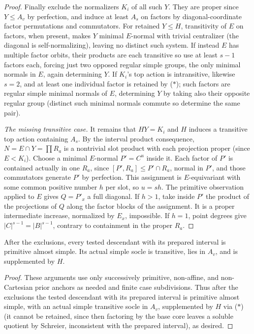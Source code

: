 \begin{proof}
Finally exclude the normalizers \(K_i\) of all such \(Y\). They are proper since \(Y\le A_v\) by perfection, and induce at least \(A_s\) on factors by diagonal-coordinate factor permutations and commutators. For retained \(Y\le H\), transitivity of \(E\) on factors, when present, makes \(Y\) minimal \(E\)-normal with trivial centralizer (the diagonal is self-normalizing), leaving no distinct such system. If instead \(E\) has multiple factor orbits, their products are each transitive so use at least \(s-1\) factors each, forcing just two opposed regular simple groups, the only minimal normals in \(E\), again determining \(Y\). If \(K_i\)'s top action is intransitive, likewise \(s=2\), and at least one individual factor is retained by (\(*\)); such factors are regular simple minimal normals of \(E\), determining \(Y\) by taking also their opposite regular group (distinct such minimal normals commute so determine the same pair).

\textit{The missing transitive case.} It remains that \(HY=K_i\) and \(H\) induces a transitive top action containing \(A_s\). By the interval product consequence, \(N=E\cap Y=\prod R_a\) is a nontrivial slot product with each projection proper (since \(E<K_i\)). Choose a minimal \(E\)-normal \(P'=C^u\) inside it. Each factor of \(P'\) is contained actually in one \(R_a\), since \([P',R_a]\le P'\cap R_a\), normal in \(P'\), and those commutators generate \(P'\) by perfection. This assignment is \(E\)-equivariant with some common positive number \(h\) per slot, so \(u=sh\). The primitive observation applied to \(E\) gives \(Q=P'_x\) a full diagonal. If \(h>1\), take inside \(P'\) the product of the projections of \(Q\) along the factor blocks of the assignment. It is a proper intermediate increase, normalized by \(E_x\), impossible. If \(h=1\), point degrees give \(|C|^{s-1}=|B|^{s-1}\), contrary to containment in the proper \(R_a\).
\end{proof}

\begin{theorem}\label{c:alternating-conclusion}
After the exclusions, every tested descendant with its prepared interval is primitive almost simple. Its actual simple socle is transitive, lies in \(A_v\), and is supplemented by \(H\).
\end{theorem}

\begin{proof}
These arguments use only successively primitive, non-affine, and non-Cartesian prior anchors as needed and finite case subdivisions. Thus after the exclusions the tested descendant with its prepared interval is primitive almost simple, with an actual simple transitive socle in \(A_v\), supplemented by \(H\) via (\(*\)) (it cannot be retained, since then factoring by the base core leaves a soluble quotient by Schreier, inconsistent with the prepared interval), as desired.
\end{proof}
